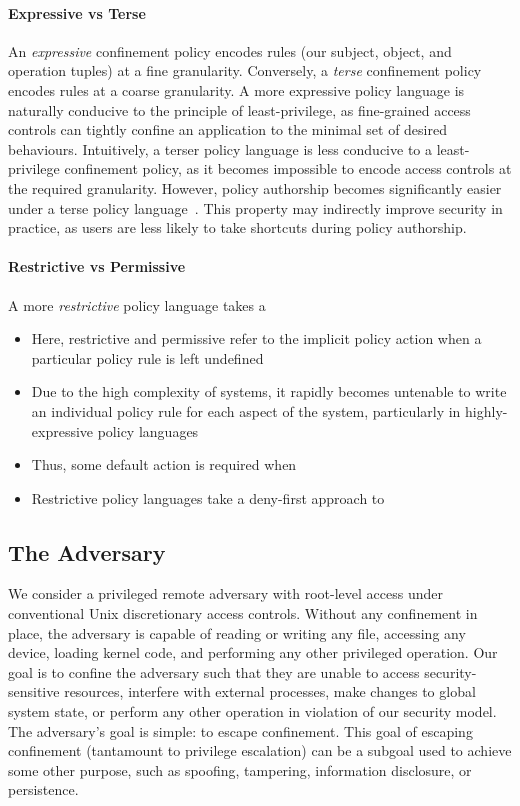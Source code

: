 \paragraph*{Expressive vs Terse} An \textit{expressive} confinement policy encodes rules
(our subject, object, and operation tuples) at a fine granularity. Conversely,
a \textit{terse} confinement policy encodes rules at a coarse granularity. A more
expressive policy language is naturally conducive to the principle of least-privilege, as
fine-grained access controls can tightly confine an application to the minimal set of
desired behaviours.  Intuitively, a terser policy language is less conducive to
a least-privilege confinement policy, as it becomes impossible to encode access controls
at the required granularity. However, policy authorship becomes significantly easier under
a terse policy language~\cite{schreuders2012_towards}. This property may indirectly
improve security in practice, as users are less likely to take shortcuts during policy
authorship.

\paragraph*{Restrictive vs Permissive} A more \textit{restrictive} policy language
takes a
\begin{inprogress}
  \begin{itemize}
    \item Here, restrictive and permissive refer to the implicit policy action when
          a particular policy rule is left undefined
    \item Due to the high complexity of systems, it rapidly becomes untenable to write an
          individual policy rule for each aspect of the system, particularly in
          highly-expressive policy languages
    \item Thus, some default action is required when 
    \item Restrictive policy languages take a deny-first approach to
  \end{itemize}
\end{inprogress}

\subsection{The Adversary}

We consider a privileged remote adversary with root-level access under conventional Unix
discretionary access controls. Without any confinement in place, the adversary is capable
of reading or writing any file, accessing any device, loading kernel code, and performing
any other privileged operation. Our goal is to confine the adversary such that they are
unable to access security-sensitive resources, interfere with external processes, make
changes to global system state, or perform any other operation in violation of our
security model. The adversary's goal is simple: to escape confinement. This goal of
escaping confinement (tantamount to privilege escalation) can be a subgoal used to achieve
some other purpose, such as spoofing, tampering, information disclosure, or persistence.

